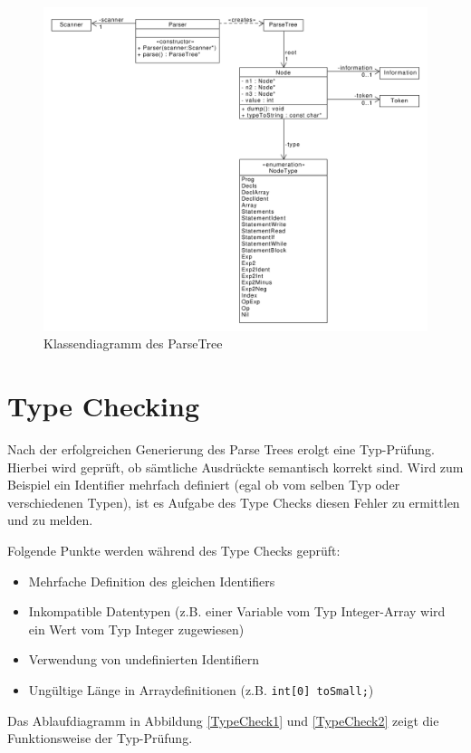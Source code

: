 \documentclass[
	a4paper
]{scrreprt}
\begin{document}
\begin{figure}[htbp]
\centering
\includegraphics[width=\textwidth]{./diagramms/parser.pdf}
\caption{Klassendiagramm des ParseTree}
\label{parseTree}
\end{figure}


\section{Type Checking}
Nach der erfolgreichen Generierung des Parse Trees erolgt eine Typ-Prüfung. Hierbei wird geprüft, ob sämtliche Ausdrückte semantisch korrekt sind. Wird zum Beispiel ein Identifier mehrfach definiert (egal ob vom selben Typ oder verschiedenen Typen), ist es Aufgabe des Type Checks diesen Fehler zu ermittlen und zu melden.

Folgende Punkte werden während des Type Checks geprüft:
\begin{itemize}
\item Mehrfache Definition des gleichen Identifiers
\item Inkompatible Datentypen (z.B. einer Variable vom Typ Integer-Array wird ein Wert vom Typ Integer zugewiesen)
\item Verwendung von undefinierten Identifiern
\item Ungültige Länge in Arraydefinitionen (z.B. \lstinline{int[0] toSmall;})
\end{itemize}

Das Ablaufdiagramm in Abbildung \ref{TypeCheck1} und \ref{TypeCheck2} zeigt die Funktionsweise der Typ-Prüfung.
\end{document}

